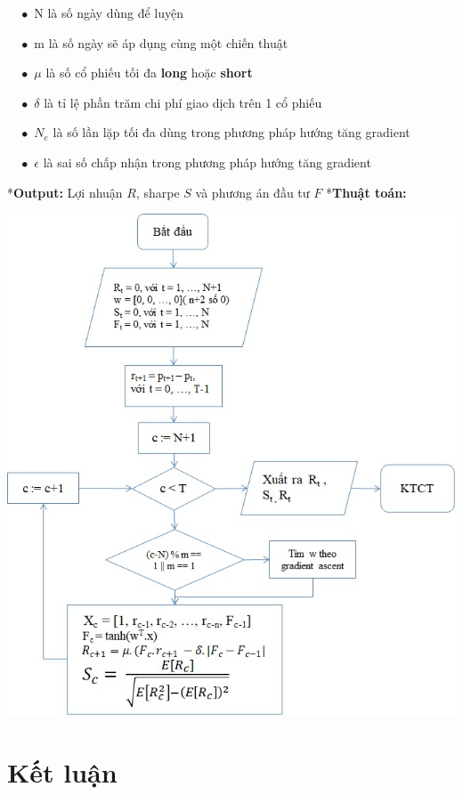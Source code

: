 \documentclass[14pt]{extreport}
\begin{document}
$\quad \bullet $ N là số ngày dùng để luyện

$\quad \bullet $ m là số ngày sẽ áp dụng cùng một chiến thuật

$\quad \bullet $ {\large $\mu$} là số cổ phiếu tối đa \textbf{long} hoặc \textbf{short} 

$\quad \bullet $ {\large $\delta$} là tỉ lệ phần trăm chi phí giao dịch trên 1 cổ phiếu 

$\quad \bullet $ $N_e$ là số lần lặp tối đa dùng trong phương pháp hướng tăng gradient

$\quad \bullet $ {\large $\epsilon$} là sai số chấp nhận trong phương pháp hướng tăng gradient

*\textbf{Output: } Lợi nhuận $\mathit{R}$, sharpe $\mathit{S}$ và phương án đầu tư $\mathit{F}$ 
\newpage
*\textbf{Thuật toán: }

\begin{center}
\includegraphics[scale=0.9]{Thuat_toan.jpg}
\end{center}

\chapter{Kết luận}
\end{document}

